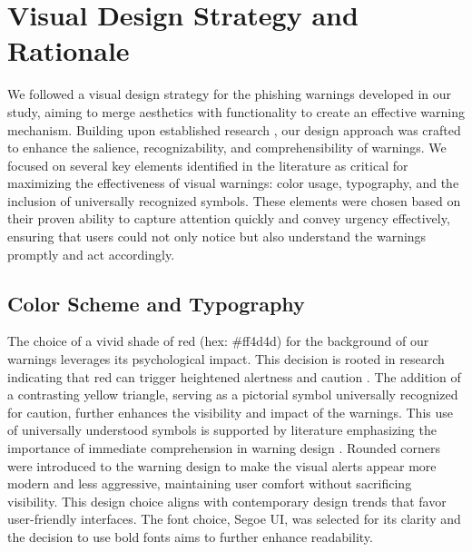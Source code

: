 \documentclass[
  a4paper,  %
  twoside,  %
  bibliography=totoc,
  headsepline,
  cleardoublepage=empty,
  parskip=half,
  draft=false
]{scrbook}
\begin{document}
\section{Visual Design Strategy and Rationale}
We followed a visual design strategy for the phishing warnings developed in our study, aiming to merge aesthetics with functionality to create an effective warning mechanism. Building upon established research \cite{wogalter2002}, our design approach was crafted to enhance the salience, recognizability, and comprehensibility of warnings. We focused on several key elements identified in the literature as critical for maximizing the effectiveness of visual warnings: color usage, typography, and the inclusion of universally recognized symbols. These elements were chosen based on their proven ability to capture attention quickly and convey urgency effectively, ensuring that users could not only notice but also understand the warnings promptly and act accordingly.

\subsection{Color Scheme and Typography}
The choice of a vivid shade of red (hex: \#ff4d4d) for the background of our warnings leverages its psychological impact. This decision is rooted in research indicating that red can trigger heightened alertness and caution \cite{kuniecki, wogalter2002}. The addition of a contrasting yellow triangle, serving as a pictorial symbol universally recognized for caution, further enhances the visibility and impact of the warnings. This use of universally understood symbols is supported by literature emphasizing the importance of immediate comprehension in warning design \cite{wogalter2002}. \newline
Rounded corners were introduced to the warning design to make the visual alerts appear more modern and less aggressive, maintaining user comfort without sacrificing visibility. This design choice aligns with contemporary design trends that favor user-friendly interfaces. \newline
The font choice, Segoe UI, was selected for its clarity and the decision to use bold fonts aims to further enhance readability.
\end{document}
